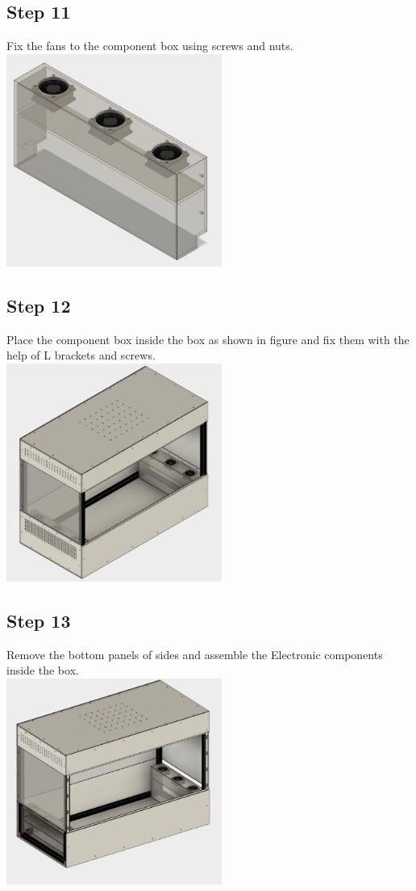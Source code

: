 \documentclass[a4paper,12pt,oneside]{book}
\begin{document}
\subsection*{Step 11}
Fix the fans to the component box using screws and nuts.\\
\includegraphics[width=200pt]{11}
\subsection*{Step 12}
Place the component box inside the box as shown in figure and fix them with the help of L brackets and screws.\\
\includegraphics[width=200pt]{12}
\subsection*{Step 13}
Remove the bottom panels of sides and assemble the Electronic components inside the box. \\
\includegraphics[width=200pt]{13}
\end{document}
